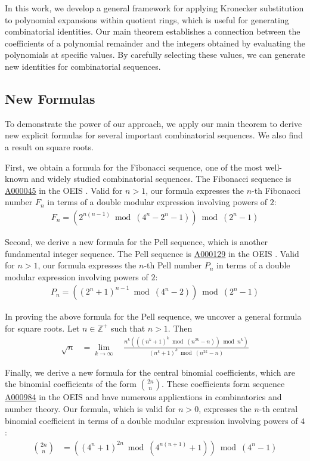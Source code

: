 \documentclass[12pt,reqno]{article}
\theoremstyle{plain}
\theoremstyle{definition}
\newcommand{\seqnum}[1]{\href{https://oeis.org/#1}{\rm \underline{#1}}}
\begin{document}
In this work, we develop a general framework for applying Kronecker substitution to polynomial expansions within quotient rings, which is useful for generating combinatorial identities. Our main theorem establishes a connection between the coefficients of a polynomial remainder and the integers obtained by evaluating the polynomials at specific values. By carefully selecting these values, we can generate new identities for combinatorial sequences.

\subsection{New Formulas}
To demonstrate the power of our approach, we apply our main theorem to derive new explicit formulas for several important combinatorial sequences. We also find a result on square roots.

First, we obtain a formula for the Fibonacci sequence, one of the most well-known and widely studied combinatorial sequences. The Fibonacci sequence is \seqnum{A000045} in the OEIS \cite{A000045}. Valid for $n > 1$, our formula expresses the $n$-th Fibonacci number $F_n$ in terms of a double modular expression involving powers of $2$:
\begin{align*}
    F_n = (2^{n(n-1)} \bmod{(4^n-2^n-1)}) \bmod{(2^n-1)}
\end{align*}

Second, we derive a new formula for the Pell sequence, which is another fundamental integer sequence. The Pell sequence is \seqnum{A000129} in the OEIS \cite{A000129}. Valid for $n > 1$, our formula expresses the $n$-th Pell number $P_n$ in terms of a double modular expression involving powers of $2$:
\begin{align*}
    P_n = ((2^{n}+1)^{n-1} \bmod{(4^n-2)}) \bmod{(2^n-1)}
\end{align*}

In proving the above formula for the Pell sequence, we uncover a general formula for square roots. Let $n \in \mathbb{Z}^+$ such that $n > 1$. Then
\begin{align*}
\sqrt{n} &= \lim_{k\rightarrow\infty} \quad
    \frac{n^k (((n^k + 1)^k \bmod{(n^{2k}-n)}) \bmod{n^k})}
        {(n^k + 1)^k \bmod{(n^{2k}-n)}}
\end{align*}

Finally, we derive a new formula for the central binomial coefficients, which are the binomial coefficients of the form $\binom{2n}{n}$. These coefficients form sequence \seqnum{A000984} in the OEIS \cite{A000984} and have numerous applications in combinatorics and number theory. Our formula, which is valid for $n > 0$, expresses the $n$-th central binomial coefficient in terms of a double modular expression involving powers of $4$:
\begin{align*}
    \binom{2n}{n} &= ((4^n + 1)^{2n} \bmod{(4^{n(n+1)} + 1)}) \bmod{(4^n-1)}
\end{align*}
\end{document}
